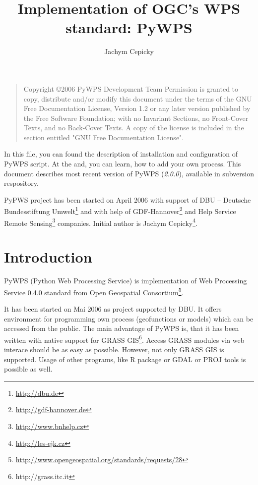 \documentclass[a4paper,11pt]{article}
\author{Jachym Cepicky}
\title{Implementation of OGC's WPS standard: PyWPS}
\newcommand{\version}{\emph{2.0.0}}
\begin{document}
\maketitle{}

\bigskip
\begin{quote}
    Copyright \copyright  2006 PyWPS Development Team
    Permission is granted to copy, distribute and/or modify this document
    under the terms of the GNU Free Documentation License, Version 1.2
    or any later version published by the Free Software Foundation;
    with no Invariant Sections, no Front-Cover Texts, and no Back-Cover Texts.
    A copy of the license is included in the section entitled "GNU
    Free Documentation License".
\end{quote}
\bigskip


In this file, you can found the description of installation and
configuration of PyWPS script. At the and, you can learn, how to add
your own process. This document describes most recent
version of PyWPS (\version), available in subversion respository.

PyPWS project has been started on April 2006 with support of DBU --
Deutsche Bundesstiftung Umwelt\footnote{\url{http://dbu.de}} and with help of
GDF-Hannover\footnote{\url{http://gdf-hannover.de}} and Help Service Remote
Sensing\footnote{\url{http://www.bnhelp.cz}} companies. Initial author is Jachym
Cepicky\footnote{\url{http://les-ejk.cz}}.
    

    \tableofcontents

\newpage

\section{Introduction}
PyWPS (Python Web Processing Service) is implementation of Web
Processing Service 0.4.0 standard from Open Geospatial
Consortium\footnote{\url{http://www.opengeospatial.org/standards/requests/28}}.

It has been started on Mai 2006 as project supported by DBU. It offers
environment for programming own process (geofunctions or models) which can
be accessed from the public. The main advantage of PyWPS is, that it has
been written with native support for GRASS
GIS\footnote{http://grass.itc.it}. Access GRASS modules via web
interace should be as easy as possible.
However, not only GRASS GIS is supported. Usage of other programs, like
R package or GDAL or PROJ tools is possible as well.
\end{document}
